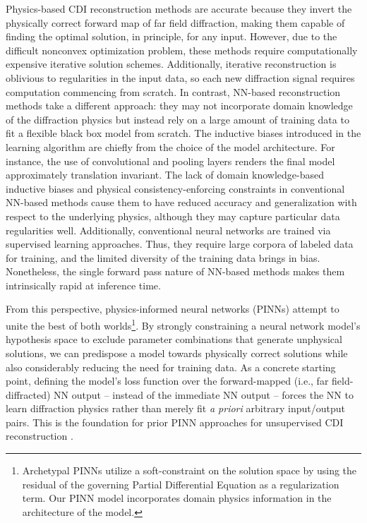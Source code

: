 \documentclass[sn-mathphys]{sn-jnl}%
\theoremstyle{thmstyleone}%
\theoremstyle{thmstyletwo}%
\theoremstyle{thmstylethree}%
\begin{document}
Physics-based CDI reconstruction methods are accurate because they invert the physically correct forward map of far field diffraction, making them capable of finding the optimal solution, in principle, for any input. However, due to the difficult nonconvex optimization problem, these methods require computationally expensive iterative solution schemes. Additionally, iterative reconstruction is oblivious to regularities in the input data, so each new diffraction signal requires computation commencing from scratch. In contrast, NN-based reconstruction methods take a different approach: they may not incorporate domain knowledge of the diffraction physics but instead rely on a large amount of training data to fit a flexible black box model from scratch. The inductive biases introduced in the learning algorithm are chiefly from the choice of the model architecture. For instance, the use of convolutional and pooling layers renders the final model approximately translation invariant. The lack of domain knowledge-based inductive biases and physical consistency-enforcing constraints in conventional NN-based methods cause them to have reduced accuracy and generalization with respect to the underlying physics, although they may capture particular data regularities well. Additionally, conventional neural networks are trained via supervised learning approaches. Thus, they require large corpora of labeled data for training, and the limited diversity of the training data brings in bias. Nonetheless, the single forward pass nature of NN-based methods makes them intrinsically rapid at inference time.

From this perspective, physics-informed neural networks (PINNs) attempt to unite the best of both worlds\footnote{Archetypal PINNs utilize a soft-constraint on the solution space by using the residual of the governing Partial Differential Equation as a regularization term. Our PINN model incorporates domain physics information in the architecture of the model.}. By strongly constraining a neural network model's hypothesis space to exclude parameter combinations that generate unphysical solutions, we can predispose a model towards physically correct solutions while also considerably reducing the need for training data. As a concrete starting point, defining the model's loss function over the forward-mapped (i.e., far field-diffracted) NN output -- instead of the immediate NN output -- forces the NN to learn diffraction physics rather than merely fit \emph{a priori} arbitrary input/output pairs. This is the foundation for prior PINN approaches for unsupervised CDI reconstruction \cite{yao2022autophasenn, ratner2021recovering}.
\end{document}
